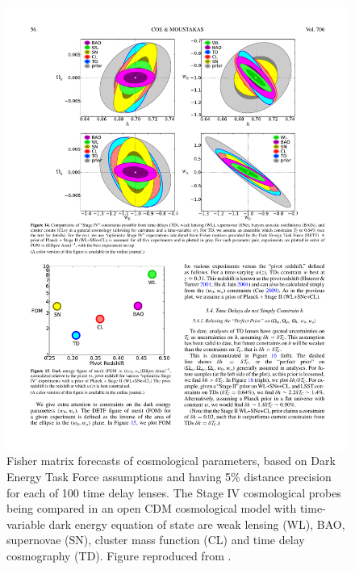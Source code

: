 \begin{figure}[!ht]
\centering\includegraphics[width=0.9\linewidth]{figures/Coe+Moustakas09_fig14.pdf}
\caption{Fisher matrix forecasts of cosmological parameters, based on
Dark Energy Task Force assumptions and having 5\% distance precision
for each of 100 time delay lenses. The Stage IV cosmological probes
being compared in an  open CDM cosmological model with time-variable
dark energy equation of state are weak lensing (WL), BAO, supernovae
(SN), cluster mass function (CL) and time delay cosmography (TD).
Figure reproduced from \citet{C+M09b}.}
\label{fig:fisher}
\end{figure}




